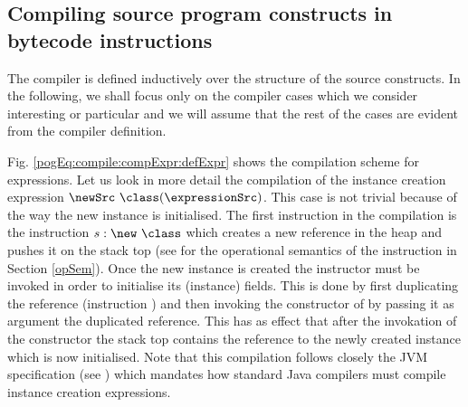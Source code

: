 

\subsection{Compiling source program  constructs in bytecode instructions} \label{pogEq:compile:compExpr} 

 The compiler is defined inductively over the structure of the source constructs. 
 In the following, we shall focus only on the compiler cases which we consider 
 interesting or particular and we will assume that the rest of the cases are evident 
 from the compiler definition.

 Fig. \ref{pogEq:compile:compExpr:defExpr} shows the compilation scheme for expressions.
 Let us look in more detail the compilation of  the instance creation expression
 $\newSrc \ \class  (\expressionSrc )$.
 This case is not trivial because of the way the new instance is initialised.
 The first instruction in the compilation is the instruction $s : \new \ \class$ which 
 creates a new reference in the heap and pushes it on the stack top 
 (see for the operational semantics of the instruction in Section \ref{opSem}). 
 Once the new instance is created the instructor must be invoked in order to initialise
 its (instance) fields. This is done by first duplicating the reference (instruction \dup) and then invoking the constructor \Constructor{\class}
 of \class{} by passing it as argument the duplicated reference. 
 This has as effect that after the invokation of the constructor the stack top contains 
 the reference to the newly created instance which is
 now initialised. Note that this compilation follows closely 
 the JVM specification (see \cite[\S 7.8]{VMSpec}) which mandates 
 how standard Java compilers must compile instance creation expressions.  
  


